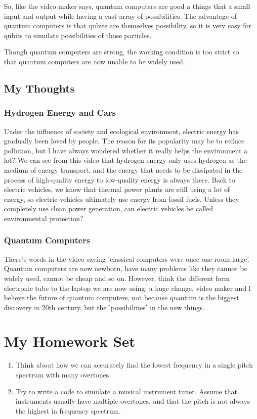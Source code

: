 \documentclass{article}
\begin{document}
So, like the video maker says, quantum computers are good a things that a small input and output while having a vast array of possibilities. The advantage of quantum computers is that qubits are themselves possibility, so it is very easy for qubits to simulate possibilities of those particles.

Though quantum computers are strong, the working condition is too strict so that quantum computers are now unable to be widely used.
\subsection{My Thoughts}
\subsubsection*{Hydrogen Energy and Cars}
Under the influence of society and ecological environment, electric energy has gradually been loved by people. The reason for its popularity may be to reduce pollution, but I have always wondered whether it really helps the environment a lot? We can see from this video that hydrogen energy only uses hydrogen as the medium of energy transport, and the energy that needs to be dissipated in the process of high-quality energy to low-quality energy is always there. Back to electric vehicles, we know that thermal power plants are still using a lot of energy, so electric vehicles ultimately use energy from fossil fuels. Unless they completely use clean power generation, can electric vehicles be called environmental protection?
\subsubsection*{Quantum Computers}
There's words in the video saying 'classical computers were once one room large'. Quantum computers are now newborn, have many problems like they cannot be widely used, cannot be cheap and so on. However, think the different form electronic tube to the laptop we are now using, a huge change, video maker and I believe the future of quantum computers, not because quantum is the biggest discovery in 20th century, but the 'possibilities' in the new things.
\section{My Homework Set}
\begin{enumerate}
	\item Think about how we can accurately find the lowest frequency in a single pitch spectrum with many overtones.
	\item Try to write a code to simulate a musical instrument tuner. Assume that instruments usually have multiple overtones, and that the pitch is not always the highest in frequency spectrum.
\end{enumerate}




% 
% 

\end{document}
